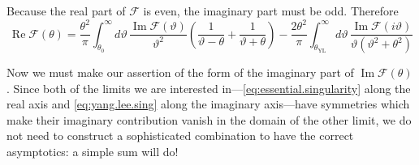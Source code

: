 \documentclass[
  aps,
  pre,
  preprint,
  longbibliography,
  floatfix
]{revtex4-2}
\begin{document}
Because the real part of $\mathcal F$ is even, the imaginary part must be odd. Therefore
\begin{equation} \label{eq:dispersion}
  \operatorname{Re}\mathcal F(\theta)
  =\frac{\theta^2}{\pi}
  \int_{\theta_0}^\infty d\vartheta\,\frac{\operatorname{Im}\mathcal F(\vartheta)}{\vartheta^2}\left(\frac1{\vartheta-\theta}+\frac1{\vartheta+\theta}\right)
  -\frac{2\theta^2}\pi\int_{\theta_{\mathrm{YL}}}^{\infty}d\vartheta\,\frac{\operatorname{Im}\mathcal F(i\vartheta)}{\vartheta(\vartheta^2+\theta^2)}
\end{equation}

Now we must make our assertion of the form of the imaginary part of
$\operatorname{Im}\mathcal F(\theta)$. Since both of the limits we are
interested in---\eqref{eq:essential.singularity} along the real axis and
\eqref{eq:yang.lee.sing} along the imaginary axis---have symmetries which make
their imaginary contribution vanish in the domain of the other limit, we do not
need to construct a sophisticated combination to have the correct asymptotics:
a simple sum will do!
\end{document}
